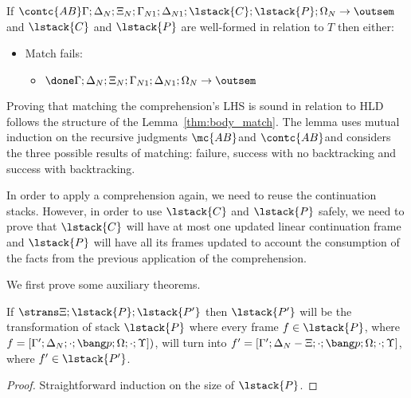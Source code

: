 \begin{lemma}
\begin{itemize}[leftmargin=*]
   

\end{itemize}
   
If $\contc{AB} \Gamma; \Delta_{N}; \Xi_{N}; \Gamma_{N1}; \Delta_{N1};
\lstack{C}; \lstack{P}; \Omega_N \rightarrow \outsem$ and $\lstack{C}$ and
$\lstack{P}$ are well-formed in relation to $T$ then either:

\begin{itemize}[leftmargin=*]
   \item Match fails:
   \begin{itemize}[leftmargin=\secondm]
      \item $\done \Gamma; \Delta_N; \Xi_N; \Gamma_{N1}; \Delta_{N1}; \Omega_N \rightarrow \outsem$
   \end{itemize}

   
\end{itemize}
\end{lemma}

Proving that matching the comprehension's LHS is sound in relation to HLD
follows the structure of the Lemma~\ref{thm:body_match}. The lemma uses mutual
induction on the recursive judgments $\mc{AB}$and $\contc{AB}$and considers the
three possible results of matching: failure, success with no backtracking and
success with backtracking.

In order to apply a comprehension again, we need to reuse the continuation
stacks. However, in order to use $\lstack{C}$ and $\lstack{P}$ safely, we need
to prove that $\lstack{C}$ will have at most one updated linear continuation
frame and $\lstack{P}$ will have all its frames updated to account the
consumption of the facts from the previous application of the comprehension.

We first prove some auxiliary theorems.

\begin{theorem}\label{thm:stack_update}
If $\strans \Xi; \lstack{P}; \lstack{P'}$ then $\lstack{P'}$ will be the
transformation of stack $\lstack{P}$ where
every frame $f \in \lstack{P}$, where $f = [\Gamma'; \Delta_N; \cdot; \bang p; \Omega; \cdot;
      \Upsilon])$, will turn into $f' = [\Gamma'; \Delta_N - \Xi; \cdot;
      \bang p; \Omega; \cdot; \Upsilon]$, where $f' \in \lstack{P'}$.
\end{theorem}
\begin{proof}
Straightforward induction on the size of $\lstack{P}$.
\end{proof}

